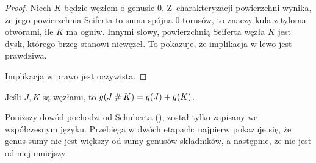 \begin{proof}
    Niech $K$ będzie węzłem o genusie $0$.
    Z~charakteryzacji powierzchni wynika, że jego powierzchnia Seiferta to suma spójna $0$ torusów, to znaczy kula z tyloma otworami, ile $K$ ma ogniw.
    Innymi słowy, powierzchnią Seiferta węzła $K$ jest dysk, którego brzeg stanowi niewęzeł.
    To pokazuje, że implikacja w lewo jest prawdziwa.

    Implikacja w prawo jest oczywista.
\end{proof}

\begin{proposition}
    \label{prp:genus_of_sum}
    Jeśli $J, K$ są węzłami, to $g (J \mathbin{\#} K) = g(J) + g(K)$.
\end{proposition}

Poniższy dowód pochodzi od Schuberta (\cite{schubert49}), został tylko zapisany we współczesnym języku.
Przebiega w dwóch etapach: najpierw pokazuje się, że genus sumy nie jest większy od sumy genusów składników, a następnie, że nie jest od niej mniejszy.

